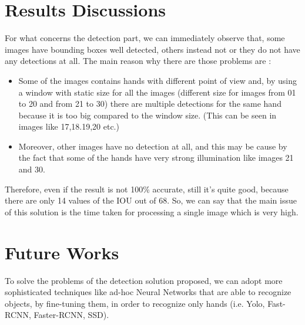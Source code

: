 \section{Results Discussions}
For what concerns the detection part, we can immediately observe that, some images have bounding boxes well detected, others instead not or they do not have any detections at all. 
The main reason why there are those problems are :
\begin{itemize}
    \item Some of the images contains hands with different point of view and, by using a window with static size for all the images (different size for images from 01 to 20 and from 21 to 30) there are multiple detections for the same hand because it is too big compared to the window size. (This can be seen in images like 17,18.19,20 etc.)
    \item Moreover, other images have no detection at all, and this may be cause by the fact that some of the hands have very strong illumination like images 21 and 30.
\end{itemize}
Therefore, even if the result is not 100\% accurate, still it's quite good, because there are only 14 values of the IOU out of 68. So, we can say that the main issue of this solution is the time taken for processing a single image which is very high.


\section{Future Works}
To solve the problems of the detection solution proposed, we can adopt more sophisticated techniques like ad-hoc Neural Networks that are able to recognize objects, by fine-tuning them, in order to recognize only hands (i.e. Yolo, Fast-RCNN, Faster-RCNN, SSD).